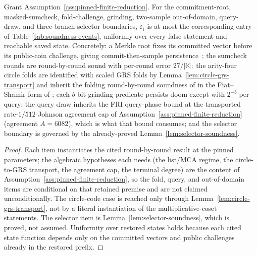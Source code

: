 \begin{lemma}
\label{lem:generic-boundary-rbr}
Grant Assumption~\ref{ass:pinned-finite-reduction}.  For the commitment-root,
masked-sumcheck, fold-challenge, grinding, two-sample out-of-domain, query-draw, and
three-branch-selector boundaries, \(\varepsilon_i\) is at most the
corresponding entry of Table~\ref{tab:soundness-events}, uniformly over every
false statement and reachable saved state.  Concretely: a Merkle root fixes its
committed vector before its public-coin challenge, giving commit-then-sample
persistence~\citep{BenSassonChiesaSpooner2016}; the sumcheck rounds are
round-by-round sound with per-round error \(27/|\mathbb K|\); the arity-four
circle folds are identified with scaled GRS folds by
Lemma~\ref{lem:circle-grs-transport} and inherit the folding round-by-round
soundness of \citet{ArnonChiesaFenziYogev2025WHIR} in the Fiat--Shamir form
of \citet{BlockGarretaKatzThalerTiwariZajac2023}; each \(b\)-bit grinding
predicate persists doom except with \(2^{-b}\) per query; the query draw
inherits the FRI query-phase bound at the transported rate-\(1/512\) Johnson
agreement cap of Assumption~\ref{ass:pinned-finite-reduction} (agreement
\(A=6082\)), which is what that bound consumes; and the selector boundary is
governed by the already-proved Lemma~\ref{lem:selector-soundness}.
\end{lemma}

\begin{proof}
Each item instantiates the cited round-by-round result at the pinned
parameters; the algebraic hypotheses each needs (the list/MCA regime, the
circle-to-GRS transport, the agreement cap, the terminal degree) are the
content of Assumption~\ref{ass:pinned-finite-reduction}, so the fold, query,
and out-of-domain items are conditional on that retained premise and are not
claimed unconditionally.  The circle-code case is reached only through
Lemma~\ref{lem:circle-grs-transport}, not by a literal instantiation of the
multiplicative-coset statements.  The selector item is
Lemma~\ref{lem:selector-soundness}, which is proved, not assumed.  Uniformity
over restored states holds because each cited state function depends only on
the committed vectors and public challenges already in the restored prefix.
\end{proof}


